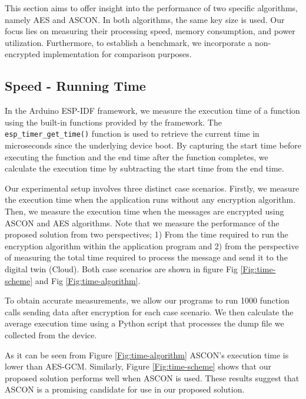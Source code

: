 This section aims to offer insight into the performance of two specific algorithms, namely AES and ASCON. In both algorithms, the same key size is used. Our focus lies on measuring their processing speed, memory consumption, and power utilization. Furthermore, to establish a benchmark, we incorporate a non-encrypted implementation for comparison purposes.

\subsection{Speed - Running Time}
% 
In the Arduino ESP-IDF framework, we measure the execution time of a function using the built-in functions provided by the framework. The \texttt{esp\_timer\_get\_time()} function is used to retrieve the current time in microseconds since the underlying device boot. By capturing the start time before executing the function and the end time after the function completes, we calculate the execution time by subtracting the start time from the end time.

Our experimental setup involves three distinct case scenarios. Firstly, we measure the execution time when the application runs without any encryption algorithm. Then, we measure the execution time when the messages are encrypted using ASCON and AES algorithms. Note that we measure the performance of the proposed solution from two perspectives; 1) From the time required to run the encryption algorithm within the application program and 2) from the perspective of measuring the total time required to process the message and send it to the digital twin (Cloud). Both case scenarios are shown in figure Fig \ref{Fig:time-scheme} and Fig \ref{Fig:time-algorithm}. 

To obtain accurate measurements, we allow our programs to run 1000 function calls sending data after encryption for each case scenario. We then calculate the average execution time using a Python script that processes the dump file we collected from the device.

As it can be seen from Figure \ref{Fig:time-algorithm} ASCON's execution time is lower than AES-GCM. Similarly, Figure \ref{Fig:time-scheme} shows that our proposed solution performs well when ASCON is used. These results suggest that ASCON is a promising candidate for use in our proposed solution.

